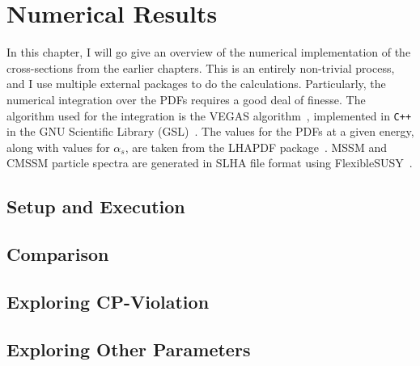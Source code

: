 \documentclass[../main.tex]{subfiles}
\begin{document}
\chapter{Numerical Results}
In this chapter, I will go give an overview of the numerical implementation of the cross-sections from the earlier chapters.
This is an entirely non-trivial process, and I use multiple external packages to do the calculations.
Particularly, the numerical integration over the PDFs requires a good deal of finesse.
The algorithm used for the integration is the VEGAS algorithm~\cite{Vegas1,Vegas2}, implemented in \verb|C++| in the GNU Scientific Library (GSL)~\cite{GSL}.
The values for the PDFs at a given energy, along with values for \(\alpha_s\), are taken from the LHAPDF package~\cite{LHAPDF}.
MSSM and CMSSM particle spectra are generated in SLHA file format using FlexibleSUSY~\cite{FlexibleSUSY1,FlexibleSUSY2}.

\section{Setup and Execution}

\section{Comparison}

\section{Exploring CP-Violation}

\section{Exploring Other Parameters}

\ifSubfilesClassLoaded{%
  {}
  
}{}
\end{document}
